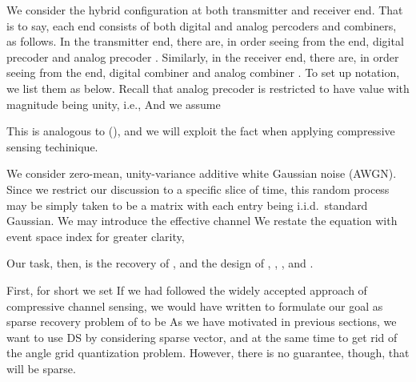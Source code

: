 We consider the hybrid configuration at both transmitter and receiver end.
That is to say, each end consists of both digital and analog percoders and combiners, as follows.
In the transmitter end, there are, in order seeing from the end, digital precoder  and analog precoder .
Similarly, in the receiver end, there are, in order seeing from the end, digital combiner  and analog combiner .
To set up notation, we list them as below.
Recall that analog precoder is restricted to have value with magnitude being unity, i.e.,
And we assume

This is analogous to (), and we will exploit the fact when applying compressive sensing techinique.

We consider zero-mean, unity-variance additive white Gaussian noise (AWGN).
Since we restrict our discussion to a specific slice of time, this random process may be simply taken to be a matrix  with each entry being i.i.d.\ standard Gaussian.
We may introduce the effective channel
We restate the equation with event space index for greater clarity,

Our task, then, is the recovery of , and the design of , , , and .

\stopsection
\startsubsection [title={Vectorization}]

First, for short we set
If we had followed the widely accepted approach of compressive channel sensing, we would have written
to formulate our goal as sparse recovery problem of  to be
As we have motivated in previous sections, we want to use DS by considering sparse vector, and at the same time to get rid of the angle grid quantization problem.
However, there is no guarantee, though, that  will be sparse.

